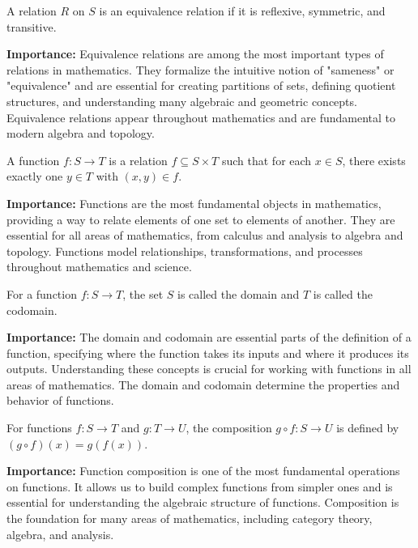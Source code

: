 \begin{definition}
A relation $R$ on $S$ is an equivalence relation if it is reflexive, symmetric, and transitive.
\end{definition}

\noindent\textbf{Importance:} Equivalence relations are among the most important types of relations in mathematics. They formalize the intuitive notion of "sameness" or "equivalence" and are essential for creating partitions of sets, defining quotient structures, and understanding many algebraic and geometric concepts. Equivalence relations appear throughout mathematics and are fundamental to modern algebra and topology.



\begin{definition}[Function]
A function $f: S \to T$ is a relation $f \subseteq S \times T$ such that for each $x \in S$, there exists exactly one $y \in T$ with $(x,y) \in f$.
\end{definition}

\noindent\textbf{Importance:} Functions are the most fundamental objects in mathematics, providing a way to relate elements of one set to elements of another. They are essential for all areas of mathematics, from calculus and analysis to algebra and topology. Functions model relationships, transformations, and processes throughout mathematics and science.



\begin{definition}
For a function $f: S \to T$, the set $S$ is called the domain and $T$ is called the codomain.
\end{definition}

\noindent\textbf{Importance:} The domain and codomain are essential parts of the definition of a function, specifying where the function takes its inputs and where it produces its outputs. Understanding these concepts is crucial for working with functions in all areas of mathematics. The domain and codomain determine the properties and behavior of functions.



\begin{definition}
For functions $f: S \to T$ and $g: T \to U$, the composition $g \circ f: S \to U$ is defined by $(g \circ f)(x) = g(f(x))$.
\end{definition}

\noindent\textbf{Importance:} Function composition is one of the most fundamental operations on functions. It allows us to build complex functions from simpler ones and is essential for understanding the algebraic structure of functions. Composition is the foundation for many areas of mathematics, including category theory, algebra, and analysis.



